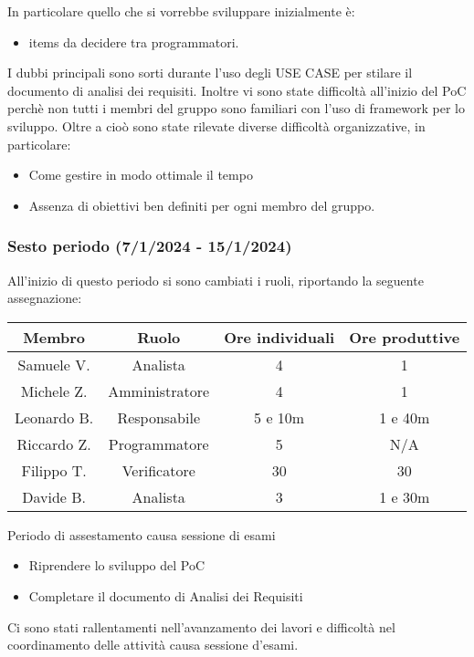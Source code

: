 In particolare quello che si vorrebbe sviluppare inizialmente è: 
\begin{itemize}
    \item items da decidere tra programmatori.
\end{itemize}


I dubbi principali sono sorti durante l'uso degli USE CASE per stilare il documento di analisi dei requisiti. Inoltre vi sono state difficoltà all'inizio del PoC perchè non tutti i membri del gruppo sono familiari con l'uso di framework per lo sviluppo.
Oltre a cioò sono state rilevate diverse difficoltà organizzative, in particolare:
\begin{itemize}
    \item Come gestire in modo ottimale il tempo
    \item Assenza di obiettivi ben definiti per ogni membro del gruppo.
\end{itemize}

\subsubsection{Sesto periodo (7/1/2024 - 15/1/2024)}
All'inizio di questo periodo si sono cambiati i ruoli, riportando la seguente assegnazione:

\vspace{10 mm}
\begin{tabular}{|c|c|c|c|}
\hline
\textbf{Membro} & \textbf{Ruolo} & \textbf{Ore individuali} & \textbf{Ore produttive} \\
\hline
Samuele V. & Analista & 4 & 1 \\
\hline
Michele Z. & Amministratore & 4 & 1 \\
\hline
Leonardo B. & Responsabile & 5 e 10m & 1 e 40m \\
\hline
Riccardo Z. & Programmatore & 5 & N/A \\
\hline
Filippo T. & Verificatore & 30 & 30 \\
\hline
Davide B. & Analista & 3 & 1 e 30m \\
\hline
\end{tabular}
\vspace{10 mm}

Periodo di assestamento causa sessione di esami
\begin{itemize}
    \item Riprendere lo sviluppo del PoC
    \item Completare il documento di Analisi dei Requisiti
\end{itemize}
Ci sono stati rallentamenti nell'avanzamento dei lavori e difficoltà nel coordinamento delle attività causa sessione d'esami.


